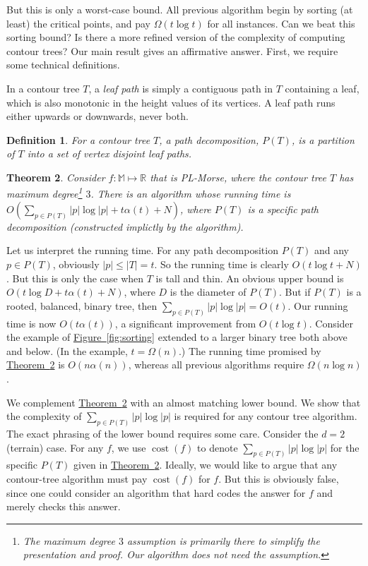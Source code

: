 \documentclass[11pt]{article}
\newtheorem{theorem}{Theorem}
\newtheorem{definition}[theorem]{Definition}
\theoremstyle{definition}
\newcommand{\MM}{\mathbb{M}}
\newcommand{\RR}{\mathbb{R}}
\newcommand{\Fig}[1]{\hyperref[fig:#1]{Figure~\ref*{fig:#1}}} %
\newcommand{\Thm}[1]{\hyperref[thm:#1]{Theorem~\ref*{thm:#1}}} %
\newcommand{\Lem}[1]{\hyperref[lem:#1]{Lemma~\ref*{lem:#1}}} %
\newcommand{\cost}{\mathop{cost}}
\begin{document}
But this is only a worst-case bound. All previous algorithm begin by sorting (at least) the critical points, and
pay $\Omega(t\log t)$ for all instances. Can we beat this sorting bound? Is there a more refined version of the complexity
of computing contour trees? Our main result gives an affirmative answer. First, we require some technical definitions.

In a contour tree $T$, a \emph{leaf path} is simply a contiguous path in $T$
containing a leaf, which is also monotonic in the height values of its vertices. A leaf path runs either upwards
or downwards, never both.

\begin{definition}
\label{def:path} For a contour tree $T$, a \emph{path decomposition}, $P(T)$, is a partition of $T$ into a set of vertex disjoint leaf paths.  
\end{definition}

\begin{theorem} \label{thm:main-alg} Consider $f:\MM \mapsto \RR$ that is PL-Morse, where the contour tree $T$
has maximum degree\footnote{The maximum degree $3$ assumption is primarily there to simplify the presentation and proof. Our algorithm
does not need the assumption.} $3$. There is an algorithm whose running time is $O(\sum_{p \in P(T)} |p|\log |p| + t\alpha(t) + N)$,
where $P(T)$ is a specific path decomposition (constructed implictly by the algorithm).
\end{theorem}

Let us interpret the running time. 
For any path decomposition $P(T)$ and any $p \in P(T)$, obviously $|p| \leq |T| = t$.
So the running time is clearly $O(t\log t + N)$. But this is only the case when $T$ is tall and thin.  
An obvious upper bound is $O(t\log D + t\alpha(t) + N)$, where $D$ is the diameter of $P(T)$. 
But if $P(T)$ is a rooted, balanced, binary tree, then $\sum_{p \in P(T)} |p|\log |p| = O(t)$.
Our running time is now $O(t\alpha(t))$, a significant improvement from $O(t\log t)$.
Consider the example of \Fig{sorting} extended to a larger binary tree both above and below.
(In the example, $t = \Omega(n)$.) The running time promised by \Thm{main-alg}
is $O(n\alpha(n))$, whereas all previous algorithms require $\Omega(n\log n)$.

We complement \Thm{main-alg} with an almost matching lower bound. We show that the complexity
of $\sum_{p \in P(T)} |p|\log |p|$ is required for any contour tree algorithm. The exact phrasing
of the lower bound requires some care. Consider the $d=2$ (terrain) case. For any $f$,
we use $\cost(f)$ to denote $\sum_{p \in P(T)} |p|\log |p|$ for the specific $P(T)$
given in \Thm{main-alg}. Ideally, we would like to argue that any contour-tree algorithm
must pay $\cost(f)$ for $f$. But this is obviously false, since one could consider an algorithm
that hard codes the answer for $f$ and merely checks this answer.
\end{document}
